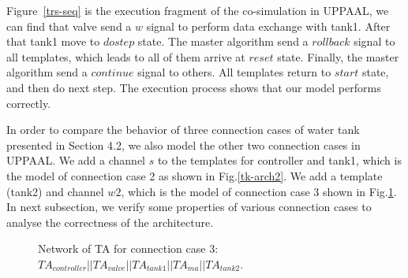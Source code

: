 Figure~\ref{trs-seq} is the execution fragment of the co-simulation in UPPAAL, we can find that valve send a $w$ signal to perform data exchange with tank1. After that tank1 move to $dostep$ state. The master algorithm send a $rollback$ signal to all templates, which leads to all of them arrive at $reset$ state. Finally, the master algorithm send a $continue$ signal to others. All templates return to $start$ state, and then do next step. The execution process shows that our model performs correctly.

In order to compare the behavior of three connection cases of water tank presented in Section 4.2, we also model the other two connection cases in UPPAAL. We add a channel $s$ to the templates for controller and tank1, which is the model of connection case 2 as shown in Fig.\ref{tk-arch2}. We add a template (tank2) and channel $w2$, which is the model of connection case 3 shown in Fig.\ref{arc3}. In next subsection, we verify some properties of various connection cases to analyse the correctness of the architecture.
\begin{figure}[htbp]
\end{figure}
\begin{figure}[htbp]
	\caption{Network of TA for connection case 3: $TA_{controller} || TA_{valve} || TA_{tank1} || TA_{ma} || TA_{tank2} $.}\label{arc3}
\end{figure}

